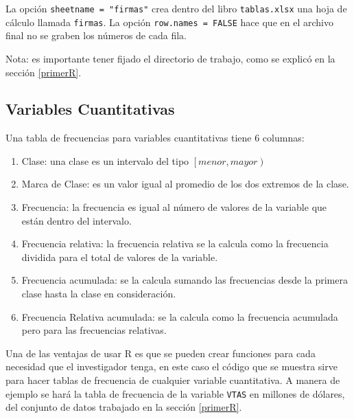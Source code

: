 \documentclass[
]{krantz}
\providecommand{\tightlist}{%
  \setlength{\itemsep}{0pt}\setlength{\parskip}{0pt}}
\begin{document}
La opción \texttt{sheetname\ =\ "firmas"} crea dentro del libro \texttt{tablas.xlsx} una hoja de cálculo llamada \texttt{firmas}. La opción \texttt{row.names\ =\ FALSE} hace que en el archivo final no se graben los números de cada fila.

Nota: es importante tener fijado el directorio de trabajo, como se explicó en la sección \ref{primerR}.

\hypertarget{variables-cuantitativas}{%
\subsection{Variables Cuantitativas}\label{variables-cuantitativas}}

Una tabla de frecuencias para variables cuantitativas tiene 6 columnas:

\begin{enumerate}
\def\labelenumi{\arabic{enumi}.}
\tightlist
\item
  Clase: una clase es un intervalo del tipo \(\left[ menor, mayor \right)\)
\item
  Marca de Clase: es un valor igual al promedio de los dos extremos de la clase.
\item
  Frecuencia: la frecuencia es igual al número de valores de la variable que están dentro del intervalo.
\item
  Frecuencia relativa: la frecuencia relativa se la calcula como la frecuencia dividida para el total de valores de la variable.
\item
  Frecuencia acumulada: se la calcula sumando las frecuencias desde la primera clase hasta la clase en consideración.
\item
  Frecuencia Relativa acumulada: se la calcula como la frecuencia acumulada pero para las frecuencias relativas.
\end{enumerate}

Una de las ventajas de usar R es que se pueden crear funciones para cada necesidad que el investigador tenga, en este caso el código que se muestra sirve para hacer tablas de frecuencia de cualquier variable cuantitativa. A manera de ejemplo se hará la tabla de frecuencia de la variable \texttt{VTAS} en millones de dólares, del conjunto de datos trabajado en la sección \ref{primerR}.
\end{document}
